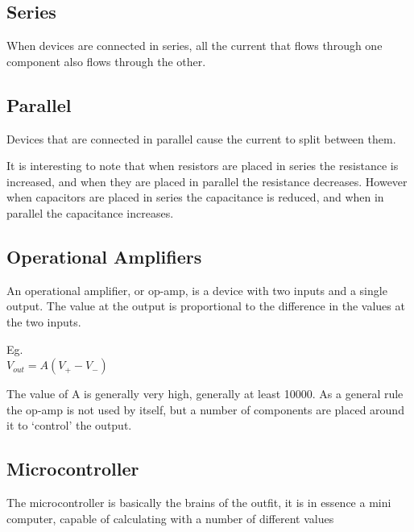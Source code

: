 \subsection{Series}
When devices are connected in series, all the current that flows through one component also flows through the other.

\subsection{Parallel}
Devices that are connected in parallel cause the current to split between them.

It is interesting to note that when resistors are placed in series the resistance is increased, and when they are placed in parallel the resistance decreases.
However when capacitors are placed in series the capacitance is reduced, and when in parallel the capacitance increases.

\subsection{Operational Amplifiers}
An operational amplifier, or op-amp, is a device with two inputs and a single output.
The value at the output is proportional to the difference in the values at the two inputs.

Eg.\\
$V_{out} = A(V_{+} - V_{-})$

The value of A is generally very high, generally at least 10000.
As a general rule the op-amp is not used by itself, but a number of components are placed around it to `control' the output.

\subsection{Microcontroller}

The microcontroller is basically the brains of the outfit, it is in essence a mini computer, capable of calculating with a number of different values

%
